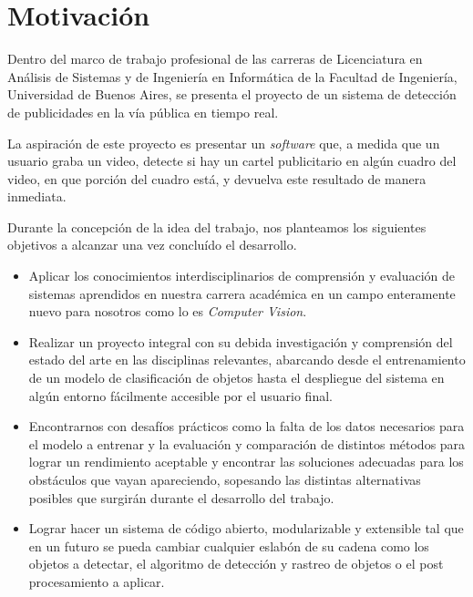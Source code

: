 \documentclass[a4paper]{article}
\begin{document}
\restoregeometry

\tableofcontents
\restoregeometry

\newpage

\section{Motivación}

Dentro del marco de trabajo profesional de las carreras de Licenciatura en Análisis de Sistemas y de Ingeniería en Informática de la Facultad de Ingeniería, Universidad de Buenos Aires, se presenta el proyecto de un sistema de detección de publicidades en la vía pública en tiempo real.

La aspiración de este proyecto es presentar un \textit{software} que, a medida que un usuario graba un video, detecte si hay un cartel publicitario en algún cuadro del video, en que porción del cuadro está, y devuelva este resultado de manera inmediata.

Durante la concepción de la idea del trabajo, nos planteamos los siguientes objetivos a alcanzar una vez concluído el desarrollo.

\begin{itemize}
    \item Aplicar los conocimientos interdisciplinarios de comprensión y evaluación de sistemas aprendidos en nuestra carrera académica en un campo enteramente nuevo para nosotros como lo es \textit{Computer Vision}.

    \item Realizar un proyecto integral con su debida investigación y comprensión del estado del arte en las disciplinas relevantes, abarcando desde el entrenamiento de un modelo de clasificación de objetos hasta el despliegue del sistema en algún entorno fácilmente accesible por el usuario final.

    \item Encontrarnos con desafíos prácticos como la falta de los datos necesarios para el modelo a entrenar y la evaluación y comparación de distintos métodos para lograr un rendimiento aceptable y encontrar las soluciones adecuadas para los obstáculos que vayan apareciendo, sopesando las distintas alternativas posibles que surgirán durante el desarrollo del trabajo.

    \item Lograr hacer un sistema de código abierto, modularizable y extensible tal que en un futuro se pueda cambiar cualquier eslabón de su cadena como los objetos a detectar, el algoritmo de detección y rastreo de objetos o el post procesamiento a aplicar.
\end{itemize}
\end{document}
